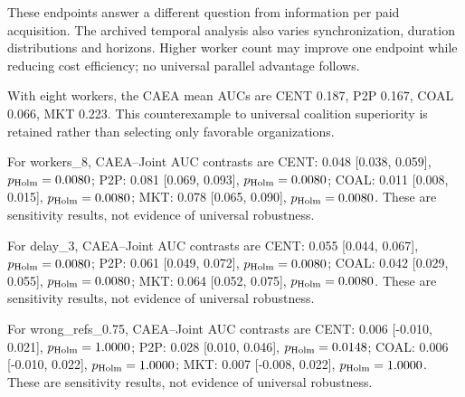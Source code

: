 These endpoints answer a different question from information per paid acquisition. The archived temporal analysis also varies synchronization, duration distributions and horizons. Higher worker count may improve one endpoint while reducing cost efficiency; no universal parallel advantage follows.

With eight workers, the CAEA mean AUCs are CENT 0.187, P2P 0.167, COAL 0.066, MKT 0.223. This counterexample to universal coalition superiority is retained rather than selecting only favorable organizations.

For workers\_8, CAEA--Joint AUC contrasts are CENT: 0.048 [0.038, 0.059], $p_{\rm Holm}=0.0080$; P2P: 0.081 [0.069, 0.093], $p_{\rm Holm}=0.0080$; COAL: 0.011 [0.008, 0.015], $p_{\rm Holm}=0.0080$; MKT: 0.078 [0.065, 0.090], $p_{\rm Holm}=0.0080$. These are sensitivity results, not evidence of universal robustness.

For delay\_3, CAEA--Joint AUC contrasts are CENT: 0.055 [0.044, 0.067], $p_{\rm Holm}=0.0080$; P2P: 0.061 [0.049, 0.072], $p_{\rm Holm}=0.0080$; COAL: 0.042 [0.029, 0.055], $p_{\rm Holm}=0.0080$; MKT: 0.064 [0.052, 0.075], $p_{\rm Holm}=0.0080$. These are sensitivity results, not evidence of universal robustness.

For wrong\_refs\_0.75, CAEA--Joint AUC contrasts are CENT: 0.006 [-0.010, 0.021], $p_{\rm Holm}=1.0000$; P2P: 0.028 [0.010, 0.046], $p_{\rm Holm}=0.0148$; COAL: 0.006 [-0.010, 0.022], $p_{\rm Holm}=1.0000$; MKT: 0.007 [-0.008, 0.022], $p_{\rm Holm}=1.0000$. These are sensitivity results, not evidence of universal robustness.

